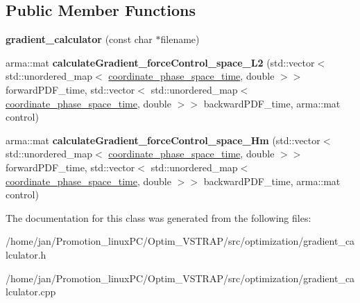 \subsection*{Public Member Functions}
\begin{DoxyCompactItemize}
\item 
\mbox{\label{classgradient__calculator_a811af658cf499119c6f00e6457880824}} 
{\bfseries gradient\+\_\+calculator} (const char $\ast$filename)
\item 
\mbox{\label{classgradient__calculator_a087141d845a78621543e127a1e180809}} 
arma\+::mat {\bfseries calculate\+Gradient\+\_\+force\+Control\+\_\+space\+\_\+\+L2} (std\+::vector$<$ std\+::unordered\+\_\+map$<$ \hyperlink{classcoordinate__phase__space__time}{coordinate\+\_\+phase\+\_\+space\+\_\+time}, double $>$$>$ forward\+P\+D\+F\+\_\+time, std\+::vector$<$ std\+::unordered\+\_\+map$<$ \hyperlink{classcoordinate__phase__space__time}{coordinate\+\_\+phase\+\_\+space\+\_\+time}, double $>$$>$ backward\+P\+D\+F\+\_\+time, arma\+::mat control)
\item 
\mbox{\label{classgradient__calculator_a8381a8497dfe88bcb04ff40ce1e235e0}} 
arma\+::mat {\bfseries calculate\+Gradient\+\_\+force\+Control\+\_\+space\+\_\+\+Hm} (std\+::vector$<$ std\+::unordered\+\_\+map$<$ \hyperlink{classcoordinate__phase__space__time}{coordinate\+\_\+phase\+\_\+space\+\_\+time}, double $>$$>$ forward\+P\+D\+F\+\_\+time, std\+::vector$<$ std\+::unordered\+\_\+map$<$ \hyperlink{classcoordinate__phase__space__time}{coordinate\+\_\+phase\+\_\+space\+\_\+time}, double $>$$>$ backward\+P\+D\+F\+\_\+time, arma\+::mat control)
\end{DoxyCompactItemize}


The documentation for this class was generated from the following files\+:\begin{DoxyCompactItemize}
\item 
/home/jan/\+Promotion\+\_\+linux\+P\+C/\+Optim\+\_\+\+V\+S\+T\+R\+A\+P/src/optimization/gradient\+\_\+calculator.\+h\item 
/home/jan/\+Promotion\+\_\+linux\+P\+C/\+Optim\+\_\+\+V\+S\+T\+R\+A\+P/src/optimization/gradient\+\_\+calculator.\+cpp\end{DoxyCompactItemize}
